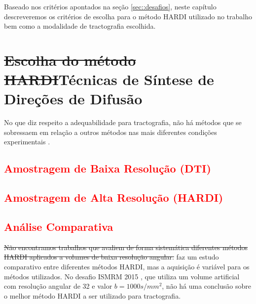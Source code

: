 \documentclass[
    12pt,                %
    oneside,            %
    a4paper,            %
    english,            %
    french,                %
    spanish,            %
    brazil                %
    ]{abntex2}
\begin{document}
Baseado nos critérios apontados na seção \ref{sec::desafios}, neste capítulo descreveremos os critérios de escolha para o método HARDI utilizado no trabalho bem como a modalidade de tractografia escolhida.

\section{\sout{Escolha do método HARDI}Técnicas de Síntese de Direções de Difusão}

No que diz respeito a adequabilidade para tractografia, não há métodos que se sobressaem em relação a outros métodos nas mais diferentes condições experimentais \cite{SCHILLING2019194}.


\textcolor{red}{\subsection{Amostragem de Baixa Resolução (DTI)}} 

\textcolor{red}{\subsection{Amostragem de Alta Resolução (HARDI)}}



\textcolor{red}{\subsection{Análise Comparativa}}



\sout{Não encontramos trabalhos que avaliem de forma sistemática diferentes métodos HARDI aplicados a volumes de baixa resolução angular.}  faz um estudo comparativo entre diferentes métodos HARDI, mas a aquisição é variável para os métodos utilizados. No desafio ISMRM 2015 \cite{TractometerTool}, que utiliza um volume artificial com resolução angular de 32 e valor $b = 1000s/mm^2$, não há uma conclusão sobre  o melhor método HARDI a ser utilizado para tractografia.
\end{document}
